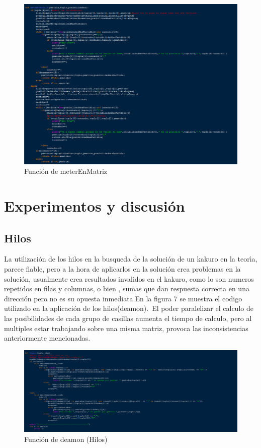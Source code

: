 \documentclass[journal]{IEEEtran}
\begin{document}
\begin{figure}[H] 
	\centering \includegraphics[width=1\columnwidth]{backtrack_parte2.png}
	\caption{
		\label{fig:samplesetup}
		Función de meterEnMatriz
	}
\end{figure}

\section{Experimentos	y	discusión}
\subsection{Hilos}
La utilizaci\'{o}n de los hilos en la busqueda de la soluci\'{o}n de un kakuro en la teor\'{\i}a, parece fiable, pero a la hora de aplicarlos en la soluci\'{o}n crea problemas en la soluci\'{o}n, usualmente crea resultados invalidos en el kakuro, como lo son numeros repetidos en filas y columnas, o bien , sumas que dan respuesta correcta en una direcci\'{o}n pero no es su opuesta inmediata.En la figura 7 se muestra el codigo utilizado en la aplicaci\'{o}n de los hilos(deamon).\ El poder paralelizar el calculo de las posibilidades de cada grupo de casillas aumenta el tiempo de calculo, pero al multiples estar trabajando sobre una misma matriz, provoca las inconsistencias anteriormente mencionadas.
\begin{figure}[h] 
	\centering \includegraphics[width=1\columnwidth]{hilos.png}
	\caption{
		\label{fig:samplesetup}
		Función de deamon (Hilos)
	}
\end{figure}
\end{document}
